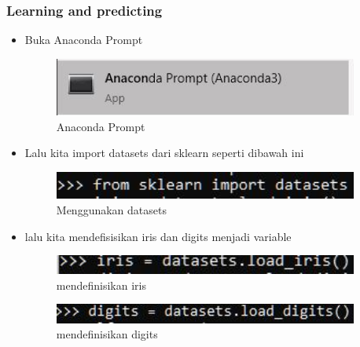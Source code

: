\subsubsection{Learning and predicting}
\begin{itemize}
\item Buka Anaconda Prompt
\begin{figure}[H]
	\begin{center}
   	 \includegraphics[width=10cm]{figures/1174083/figures1/anaconda.jpg}
   	 \caption{Anaconda Prompt}	
	\end{center}
\end{figure}

\item Lalu kita import datasets dari sklearn seperti dibawah ini
\begin{figure}[H]
	\begin{center}
   	 \includegraphics[width=10cm]{figures/1174083/figures1/5.jpg}
   	 \caption{Menggunakan datasets}	
	\end{center}
\end{figure}

\item lalu kita mendefisisikan iris dan digits menjadi variable
\begin{figure}[H]
	\begin{center}
   	 \includegraphics[width=10cm]{figures/1174083/figures1/6.jpg}
   	 \caption{mendefinisikan iris}	
	\end{center}
\end{figure}
\begin{figure}[H]
	\begin{center}
   	 \includegraphics[width=10cm]{figures/1174083/figures1/7.jpg}
   	 \caption{mendefinisikan digits}	
	\end{center}
\end{figure}


\end{itemize}
